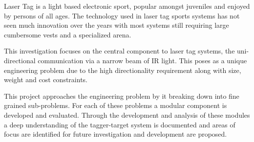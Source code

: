 Laser Tag is a light based electronic sport, popular amongst juveniles and enjoyed by persons of all ages. The technology used in laser tag sports systems has not seen much innovation over the years with most systems still requiring large cumbersome vests and a specialized arena.

This investigation focuses on the central component to laser tag systems, the uni-directional communication via a narrow beam of IR light. This poses as a unique engineering problem due to the high directionality requirement along with size, weight and cost constraints.

This project approaches the engineering problem by it breaking down into fine grained sub-problems. For each of these problems a modular component is developed and evaluated. Through the development and analysis of these modules a deep understanding of the tagger-target system is documented and areas of focus are identified for future investigation and development are proposed.